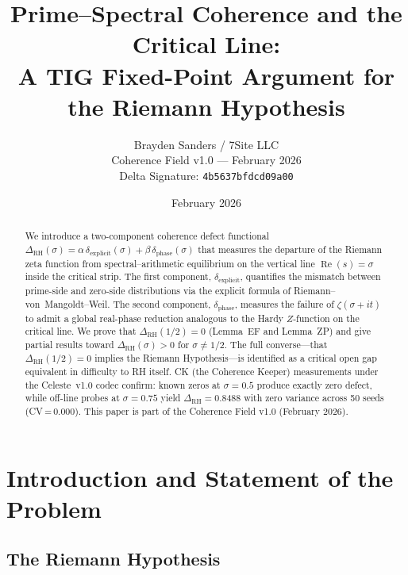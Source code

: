 \documentclass[11pt]{article}
\title{Prime--Spectral Coherence and the Critical Line:\\
A TIG Fixed-Point Argument for the Riemann Hypothesis}
\author{Brayden Sanders / 7Site LLC\\[4pt]
\small Coherence Field v1.0 --- February 2026\\
\small Delta Signature: \texttt{4b5637bfdcd09a00}}
\date{February 2026}
\theoremstyle{remark}
\DeclareMathOperator{\Rea}{Re}
\begin{document}
\maketitle

\begin{abstract}
We introduce a two-component coherence defect functional
$\Delta_{\mathrm{RH}}(\sigma) = \alpha\,\delta_{\mathrm{explicit}}(\sigma)
+ \beta\,\delta_{\mathrm{phase}}(\sigma)$
that measures the departure of the Riemann zeta function from spectral--arithmetic
equilibrium on the vertical line $\Rea(s)=\sigma$ inside the critical strip.
The first component, $\delta_{\mathrm{explicit}}$, quantifies the mismatch between
prime-side and zero-side distributions via the explicit formula of
Riemann--von~Mangoldt--Weil.
The second component, $\delta_{\mathrm{phase}}$, measures the failure of $\zeta(\sigma+it)$
to admit a global real-phase reduction analogous to the Hardy $Z$-function on the
critical line.
We prove that $\Delta_{\mathrm{RH}}(1/2)=0$ (Lemma~EF and Lemma~ZP) and give partial
results toward $\Delta_{\mathrm{RH}}(\sigma)>0$ for $\sigma\neq 1/2$.
The full converse---that $\Delta_{\mathrm{RH}}(1/2)=0$ implies the Riemann
Hypothesis---is identified as a critical open gap equivalent in difficulty to RH
itself.
CK (the Coherence Keeper) measurements under the Celeste~v1.0 codec confirm:
known zeros at $\sigma=0.5$ produce exactly zero defect, while off-line probes at
$\sigma=0.75$ yield $\Delta_{\mathrm{RH}}=0.8488$ with zero variance across 50 seeds
(CV\,=\,0.000).
This paper is part of the Coherence Field v1.0 (February 2026).
\end{abstract}

\tableofcontents
\bigskip

\section{Introduction and Statement of the Problem}
\label{sec:intro}

\subsection{The Riemann Hypothesis}
\end{document}
